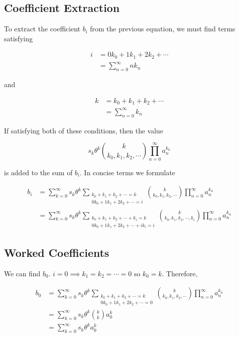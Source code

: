 \documentclass{article}
\begin{document}
\subsection{Coefficient Extraction}

\noindent
To extract the coefficient $b_i$ from the previous equation, we must find terms satisfying 

\begin{align*}
    i
    &= 0 k_0 + 1 k_1 + 2 k_2 + \cdots \\
    &= \sum_{n=0}^{\infty} n k_n
\end{align*}

\noindent
and

\begin{align*}
    k
    &= k_0 + k_1 + k_2 + \cdots \\
    &= \sum_{n=0}^{\infty} k_n
\end{align*}

\noindent
If satisfying both of these conditions, then the value

\begin{equation*}
    s_k \theta^k \binom{k}{k_0, k_1, k_2, \cdots} \prod_{n=0}^{\infty} a_n^{k_n}
\end{equation*}

\noindent
is added to the sum of $b_i$. In concise terms we formulate

\begin{align*}
    b_i
    &= \sum_{k=0}^{\infty} s_k \theta^k \sum_{\substack{k_0 + k_1 + k_2 + \cdots = k \\ 0 k_0 + 1 k_1 + 2 k_2 + \cdots = i}} \binom{k}{k_0, k_1, k_2, \cdots} \prod_{n=0}^{\infty} a_n^{k_n} \\
    &= \sum_{k=0}^{\infty} s_k \theta^k \sum_{\substack{k_0 + k_1 + k_2 + \cdots + k_i = k \\ 0 k_0 + 1 k_1 + 2 k_2 + \cdots + i k_i = i}} \binom{k}{k_0, k_1, k_2, \cdots, k_i} \prod_{n=0}^{\infty} a_n^{k_n} 
\end{align*}

\subsection{Worked Coefficients}

\noindent
We can find $b_0$. $i = 0 \implies k_1 = k_2 = \cdots = 0$ so $k_0 = k$. Therefore,

\begin{align*}
    b_0 
    &= \sum_{k=0}^{\infty} s_k \theta^k \sum_{\substack{k_0 + k_1 + k_2 + \cdots = k \\ 0 k_0 + 1 k_1 + 2 k_2 + \cdots = 0}} \binom{k}{k_0, k_1, k_2, \cdots} \prod_{n=0}^{\infty} a_n^{k_n} \\
    &= \sum_{k=0}^{\infty} s_k \theta^k \binom{k}{k} a_0^{k} \\
    &= \sum_{k=0}^{\infty} s_k \theta^k a_0^k
\end{align*}
\end{document}

